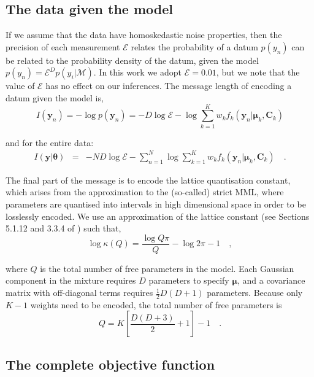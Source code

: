 \documentclass{elsarticle}
\newcommand{\vect}[1]{\boldsymbol{\mathbf{#1}}}
\def\cov{C}
\def\veccov{\vect{\cov}}
\def\vecmean{\vect{\mu}}
\def\vectheta{\vect{\theta}}
\def\weight{w}
\def\datum{y}
\def\data{\vect{\datum}}
\begin{document}
\subsection{The data given the model}
If we assume that the data have homoskedastic noise properties, then the 
precision of each measurement $\mathcal{E}$ relates the probability of a
datum $p(\datum_n)$ can be related to the probability density of
the datum, given the model 
$p(\datum_n) = \mathcal{E}^{D}p(y_i|\mathcal{M})$.
In this work we adopt $\mathcal{E} = 0.01$, but we note that the value of
$\mathcal{E}$ has no effect on our inferences.  The message length of encoding
a datum given the model is,
\begin{equation}
  I(\data_n) = -\log{p(\data_n)} = -D\log\mathcal{E} - \log\sum_{k=1}^{K}\weight_{k}f_{k}(\data_n|\vecmean_k,\veccov_k)
\end{equation}

\noindent{}and for the entire data:
\begin{eqnarray}
  I(\data|\vectheta) &=& -ND\log\mathcal{E} - \sum_{n=1}^{N}\log\sum_{k=1}^{K}w_{k}f_k(\data_n|\vecmean_k,\veccov_k) \quad .
\end{eqnarray}

The final part of the message is to encode the lattice quantisation constant,
which arises from the approximation to the (so-called) strict MML, where
parameters are quantised into intervals in high dimensional space in order to
be losslessly encoded.  We use an approximation of the lattice constant
(see Sections 5.1.12 and 3.3.4 of \citep{Wallace:2005}) such that,
\begin{equation}
  \log\kappa(Q) = \frac{\log{Q\pi}}{Q} - \log{2\pi} - 1 \quad ,
\end{equation}

\noindent{}where $Q$ is the total number of free parameters in the model. Each
Gaussian component in the mixture requires $D$ parameters to specify $\vecmean$,
and a covariance matrix with off-diagonal terms requires $\frac{1}{2}D(D+1)$ 
parameters. Because only $K - 1$ weights need to be encoded, the total number of free
parameters is
\begin{equation}
    Q = K\left[\frac{D(D+3)}{2} + 1\right] - 1 \quad .
    \label{eq:number-of-parameters}
\end{equation}


\subsection{The complete objective function}
\end{document}
